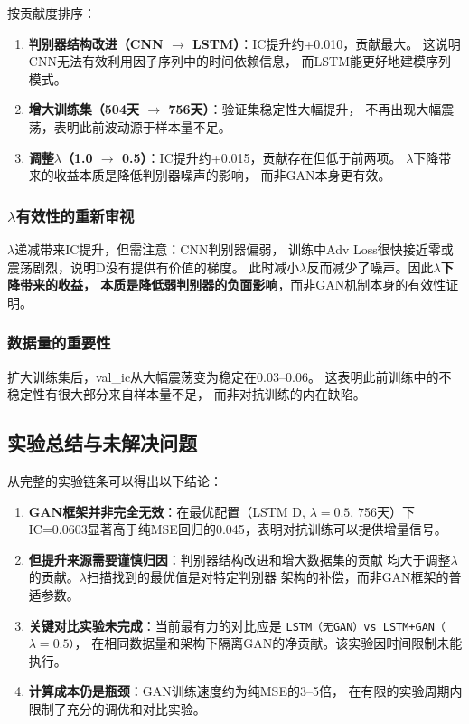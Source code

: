 \documentclass[12pt,a4paper]{ctexart}
\begin{document}
按贡献度排序：

\begin{enumerate}[leftmargin=*]
    \item \textbf{判别器结构改进（CNN $\to$ LSTM）}：IC提升约+0.010，贡献最大。
          这说明CNN无法有效利用因子序列中的时间依赖信息，
          而LSTM能更好地建模序列模式。
    \item \textbf{增大训练集（504天 $\to$ 756天）}：验证集稳定性大幅提升，
          不再出现大幅震荡，表明此前波动源于样本量不足。
    \item \textbf{调整$\lambda$（1.0 $\to$ 0.5）}：IC提升约+0.015，贡献存在但低于前两项。
          $\lambda$下降带来的收益本质是降低判别器噪声的影响，
          而非GAN本身更有效。
\end{enumerate}

\subsubsection{$\lambda$有效性的重新审视}

$\lambda$递减带来IC提升，但需注意：CNN判别器偏弱，
训练中Adv Loss很快接近零或震荡剧烈，说明D没有提供有价值的梯度。
此时减小$\lambda$反而减少了噪声。因此\textbf{$\lambda$下降带来的收益，
本质是降低弱判别器的负面影响}，而非GAN机制本身的有效性证明。

\subsubsection{数据量的重要性}

扩大训练集后，val\_ic从大幅震荡变为稳定在0.03--0.06。
这表明此前训练中的不稳定性有很大部分来自样本量不足，
而非对抗训练的内在缺陷。

\subsection{实验总结与未解决问题}

从完整的实验链条可以得出以下结论：

\begin{enumerate}[leftmargin=*]
    \item \textbf{GAN框架并非完全无效}：在最优配置（LSTM D, $\lambda=0.5$, 756天）下
          IC=0.0603显著高于纯MSE回归的0.045，表明对抗训练可以提供增量信号。
    \item \textbf{但提升来源需要谨慎归因}：判别器结构改进和增大数据集的贡献
          均大于调整$\lambda$的贡献。$\lambda$扫描找到的最优值是对特定判别器
          架构的补偿，而非GAN框架的普适参数。
    \item \textbf{关键对比实验未完成}：当前最有力的对比应是
          \texttt{LSTM（无GAN）vs LSTM+GAN（$\lambda=0.5$）}，
          在相同数据量和架构下隔离GAN的净贡献。该实验因时间限制未能执行。
    \item \textbf{计算成本仍是瓶颈}：GAN训练速度约为纯MSE的3--5倍，
          在有限的实验周期内限制了充分的调优和对比实验。
\end{enumerate}
\end{document}
